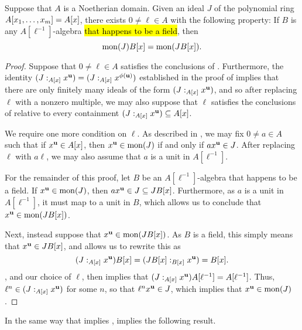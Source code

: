 \documentclass{amsart}
\begin{document}
\begin{theorem}
\label{mon-operation-general-expansion: T}
Suppose that $A$ is a Noetherian domain.  Given an ideal $J$ of the polynomial ring $A[x_1, \ldots, x_m] = A[x]$, there exists $0 \neq \ell \in A$ with the following property:  If $B$ is any $A[\ell^{-1}]$-algebra \hl{that happens to be a field}, then
\[ \operatorname{mon}(J) B[x] = \operatorname{mon}(JB[x]).\]
 \end{theorem}


\begin{proof}
Suppose that $0 \neq \ell \in A$ satisfies the conclusions of .  Furthermore, the identity $(J:_{A[x]} x^{\mathbf{u}}) = (J:_{A[x]} x^{\phi(\mathbf{u})})$ established in the proof of  implies that there are only finitely many ideals of the form $(J:_{A[x]} x^{\mathbf{u}})$, and so after replacing $\ell$ with a nonzero multiple, we may also suppose that $\ell$ satisfies the conclusions of  relative to every containment $(J:_{A[x]} x^{\mathbf{u}}) \subseteq A[x]$.


We require one more condition on $\ell$.  As described in , we may fix $0 \neq a \in A$ such that if $x^{\mathbf{u}} \in  A[x]$,  then $x^{\mathbf{u}} \in \operatorname{mon}(J)$ if and only if $ax^{\mathbf{u}} \in J$.  After replacing $\ell$ with $a \ell$, we may also assume that $a$ is a unit in $A[\ell^{-1}]$.

For the remainder of this proof, let $B$ be an $A[\ell^{-1}]$-algebra that happens to be a field.  If $x^{\mathbf{u}} \in \operatorname{mon}(J)$, then $a x^{\mathbf{u}} \in J \subseteq JB[x]$.  Furthermore, as $a$ is a unit in $A[\ell^{-1}]$, it must map to a unit in $B$, which allows us to conclude that $x^{\mathbf{u}} \in \operatorname{mon}(JB[x])$.   %

Next, instead suppose that $x^{\mathbf{u}} \in \operatorname{mon}(JB[x])$.  As $B$ is a field, this simply means that $x^{\mathbf{u}} \in JB[x]$, and   allows us to rewrite this as \[(J:_{A[x]} x^{\mathbf{u}}) B[x] = (JB[x] :_{B[x]} x^{\mathbf{u}}) = B[x].\]
, and our choice of $\ell$, then implies that $(J:_{A[x]} x^{\mathbf{u}}) A[\ell^{-1}] = A[\ell^{-1}]$.  Thus, $\ell^n \in (J:_{A[x]} x^{\mathbf{u}})$ for some $n$, so that $\ell^n x^{\mathbf{u}} \in J$, which implies that $x^{\mathbf{u}} \in \operatorname{mon}(J)$.
\end{proof}

In the same way that  implies ,  implies the following result.
\end{document}
